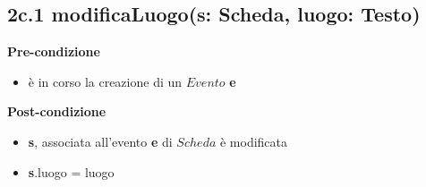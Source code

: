 \documentclass[12pt]{extarticle}
\begin{document}
%
%
%
%

\subsection*{2c.1 modificaLuogo(s: Scheda, luogo: Testo)}

\textbf{Pre-condizione}
\begin{itemize}
  \item è in corso la creazione di un $Evento$ \textbf{e}
\end{itemize} 
\textbf{Post-condizione}
\begin{itemize}
  \item \textbf{s}, associata all'evento \textbf{e} di $Scheda$ è modificata
  \item \textbf{s}.luogo = luogo
\end{itemize} 
\end{document}
